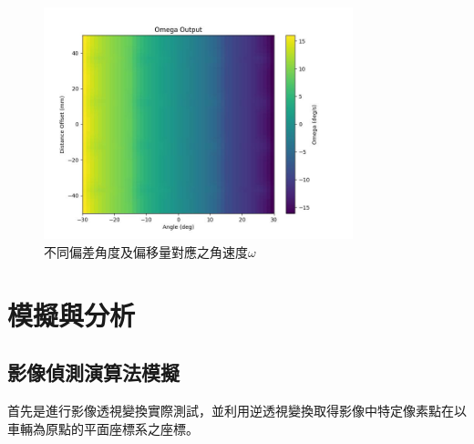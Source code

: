\documentclass[12pt]{article}       %
\begin{document}
\begin{figure}[H]
    \centering
    \includegraphics[width=0.8\textwidth]{27.jpg}     %
    \caption{不同偏差角度及偏移量對應之角速度$\omega$}    %
    \label{fig:27}    %
\end{figure}

\section{\centering 模擬與分析}

\subsection{影像偵測演算法模擬} 
\hspace{2em}首先是進行影像透視變換實際測試，並利用逆透視變換取得影像中特定像素點在以車輛為原點的平面座標系之座標。
\end{document}
